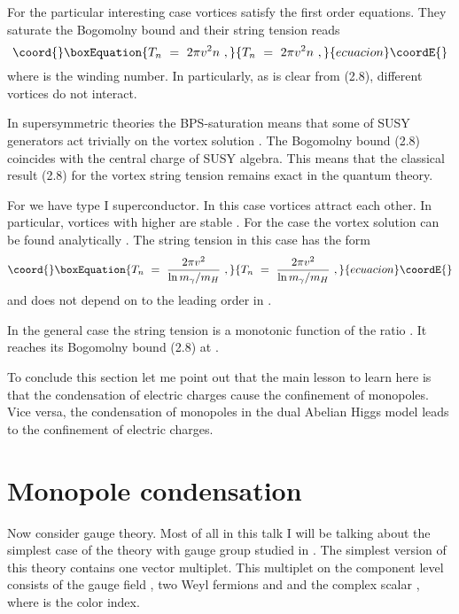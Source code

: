 \documentclass[a4paper,12pt]{article}
\begin{document}
For the particular interesting case \coordHE{} vortices
satisfy the first order equations. They saturate the Bogomolny bound
and their string tension reads \cite{B}
\begin{equation}\coord{}\boxEquation{
T_n\ =\ 2\pi v^2n\ ,
}{
T_n\ =\ 2\pi v^2n\ ,
}{ecuacion}\coordE{}\end{equation}
where \coordHE{} is the winding number.
In particularly, as is clear from (2.8), different vortices do
not interact.

In supersymmetric theories the BPS-saturation means that some of
SUSY generators act trivially on the vortex solution \cite{HS}.
The Bogomolny bound (2.8) coincides with the central charge of
SUSY algebra. This means that the classical result (2.8) for
 the vortex
string tension remains exact in the quantum theory.

For \coordHE{} we have type I superconductor. In this case
vortices attract each other. In particular, vortices with
higher \coordHE{} are stable \cite{BV}. For the case \coordHE{} the vortex solution can be found analytically
\cite{Y}. The string tension in this case has the form \cite{Y}
\begin{equation}\coord{}\boxEquation{
T_n\ =\ \frac{2\pi v^2}{\ln m_\gamma/m_H}\ ,
}{
T_n\ =\ \frac{2\pi v^2}{\ln m_\gamma/m_H}\ ,
}{ecuacion}\coordE{}\end{equation}
and does not depend on \coordHE{} to the leading order in \coordHE{}.

In the general case the string tension \coordHE{} is a monotonic 
function of the ratio \coordHE{} \cite{BV}. It reaches
its Bogomolny bound (2.8) at \coordHE{}.

To conclude this section let me point out that the main lesson
to learn here is
 that the condensation of electric charges cause the
confinement of monopoles. Vice versa,  the condensation of
monopoles in the dual Abelian Higgs model leads to the
confinement of electric charges.

\section{Monopole condensation}
\setcounter{equation}{0}


Now consider \coordHE{} gauge theory. Most of all in this talk I will
be talking about the simplest case of the theory with
\coordHE{} gauge group
studied in \cite{SW1}. The simplest version of this theory contains 
one 
  \coordHE{} vector multiplet.
This multiplet on the component level consists of  the
gauge field \coordHE{}, two Weyl fermions \coordHE{}
and \coordHE{}  \coordHE{} and the complex scalar
\coordHE{}, where \coordHE{} is the color index.
\end{document}
